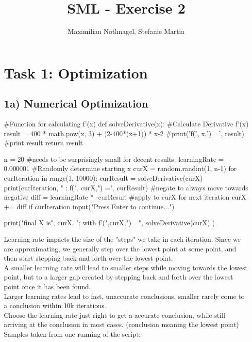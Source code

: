 \documentclass{article}
\title{SML - Exercise 2}
\author{Maximilian Nothnagel, Stefanie Martin}
\date{}
\begin{document}
	
	\maketitle
	
	\section{Task 1: Optimization}
	\subsection{1a) Numerical Optimization}
		\begin{python}
		#Function for calculating f'(x)
		def solveDerivative(x):
		#Calculate Derivative f'(x)
		result = 400 * math.pow(x, 3) + (2-400*(x+1)) * x-2 
		#print('f\'(', x,') =', result) #print result
		return result
		
		n = 20
		#needs to be surprisingly small for decent results. 
		learningRate = 0.000001 
		#Randomly determine starting x
		curX = random.randint(1, n-1) 
		for curIteration in range(1, 10000):
		curResult = solveDerivative(curX) 
		print(curIteration, " : f\'(", curX,") =", curResult)
		#negate to always move towards negative
		diff = learningRate * -curResult 
		#apply to curX for next iteration
		curX += diff 
		if curIteration %
		input("Press Enter to continue...")
		
		print("final X is", curX, "; with f'(",curX,")= ", solveDerivative(curX) )	
		\end{python}
	Learning rate impacts the size of the "steps" we take in each iteration. Since we are approximating, we generally step over the lowest point at some point, and then start stepping back and forth over the lowest point. \\
	A smaller learning rate will lead to smaller steps while moving towards the lowest point, but to a larger gap created by stepping back and forth over the lowest point once it has been found.\\
	Larger learning rates lead to fast, unaccurate conclusions, smaller rarely come to a conclusion within 10k iterations.\\
	Choose the learning rate just right to get a accurate conclusion, while still arriving at the conclusion in most cases.
	(conclusion meaning the lowest point)\\
	Samples taken from one running of the script: \\
\end{document}

